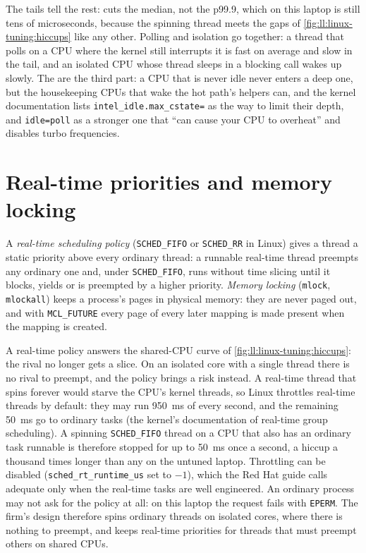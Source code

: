 The tails tell the rest:  cuts the median, not the p99.9, which on this laptop is still tens of microseconds,
because the spinning thread meets the gaps of \cref{fig:ll:linux-tuning:hiccups} like any other. Polling and isolation go
together: a thread that polls on a CPU where the kernel still interrupts it is fast on average and slow in the tail, and an
isolated CPU whose thread sleeps in a blocking call wakes up slowly. The  are the third part: a CPU that is never
idle never enters a deep one, but the housekeeping CPUs that wake the hot path's helpers can, and the kernel documentation
lists \texttt{intel\_idle.max\_cstate=} as the way to limit their depth, and \texttt{idle=poll} as a stronger one that ``can
cause your CPU to overheat'' and disables turbo frequencies.

\section{Real-time priorities and memory locking}\label{sec:ll:linux-tuning:rt}

\begin{definition}\label{def:ll:linux-tuning:rt}
A \emph{real-time scheduling policy} (\texttt{SCHED\_FIFO} or \texttt{SCHED\_RR} in
Linux) gives a thread a static priority above every ordinary thread: a runnable real-time thread preempts any ordinary one and,
under \texttt{SCHED\_FIFO}, runs without time slicing until it blocks, yields or is preempted by a higher priority.
\emph{Memory locking} (\texttt{mlock}, \texttt{mlockall}) keeps a process's pages in physical memory:
they are never paged out, and with \texttt{MCL\_FUTURE} every page of every later mapping is made present when the mapping is
created.
\end{definition}

A real-time policy answers the shared-CPU curve of \cref{fig:ll:linux-tuning:hiccups}: the rival no longer gets a slice.
On an isolated core with a single thread there is no rival to preempt, and the policy brings a risk instead. A real-time
thread that spins forever would starve the CPU's kernel threads, so Linux throttles real-time threads by default: they may run
\qty{950}{\milli\second} of every second, and the remaining \qty{50}{\milli\second} go to ordinary tasks (the kernel's
documentation of real-time group scheduling). A spinning \texttt{SCHED\_FIFO} thread on a CPU that also has an ordinary task
runnable is therefore stopped for up to \qty{50}{\milli\second} once a second, a hiccup a thousand times longer than any on the
untuned laptop. Throttling can be disabled (\texttt{sched\_rt\_runtime\_us} set to $-1$), which the Red Hat guide calls
adequate only when the real-time tasks are well engineered. An ordinary process may not ask for the policy at all: on this
laptop the request fails with \texttt{EPERM}. The firm's design therefore spins ordinary threads on isolated cores, where
there is nothing to preempt, and keeps real-time priorities for threads that must preempt others on shared CPUs.

